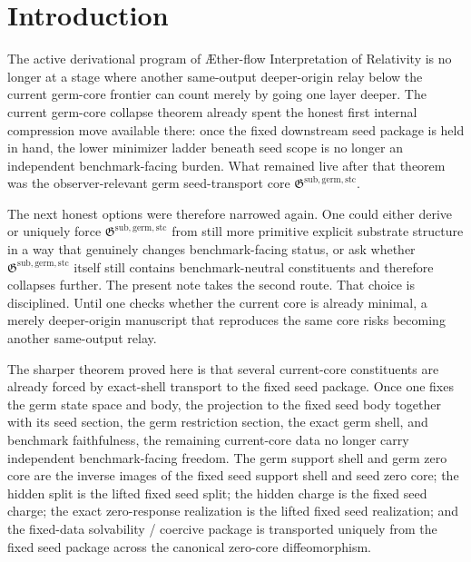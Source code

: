 \documentclass[11pt]{article}
\newcommand{\Aflow}{\AE{}ther-flow}
\newcommand{\TheoryName}{\Aflow{} Interpretation of Relativity}
\newcommand{\GermTransportCore}{\mathfrak G^{\mathrm{sub,germ,stc}}}
\begin{document}
\section{Introduction}

The active derivational program of \TheoryName{} is no longer at a stage where another same-output deeper-origin relay below the current germ-core frontier can count merely by going one layer deeper. The current germ-core collapse theorem already spent the honest first internal compression move available there: once the fixed downstream seed package is held in hand, the lower minimizer ladder beneath seed scope is no longer an independent benchmark-facing burden. What remained live after that theorem was the observer-relevant germ seed-transport core \(\GermTransportCore\).

The next honest options were therefore narrowed again. One could either derive or uniquely force \(\GermTransportCore\) from still more primitive explicit substrate structure in a way that genuinely changes benchmark-facing status, or ask whether \(\GermTransportCore\) itself still contains benchmark-neutral constituents and therefore collapses further. The present note takes the second route. That choice is disciplined. Until one checks whether the current core is already minimal, a merely deeper-origin manuscript that reproduces the same core risks becoming another same-output relay.

The sharper theorem proved here is that several current-core constituents are already forced by exact-shell transport to the fixed seed package. Once one fixes the germ state space and body, the projection to the fixed seed body together with its seed section, the germ restriction section, the exact germ shell, and benchmark faithfulness, the remaining current-core data no longer carry independent benchmark-facing freedom. The germ support shell and germ zero core are the inverse images of the fixed seed support shell and seed zero core; the hidden split is the lifted fixed seed split; the hidden charge is the fixed seed charge; the exact zero-response realization is the lifted fixed seed realization; and the fixed-data solvability / coercive package is transported uniquely from the fixed seed package across the canonical zero-core diffeomorphism.
\end{document}
